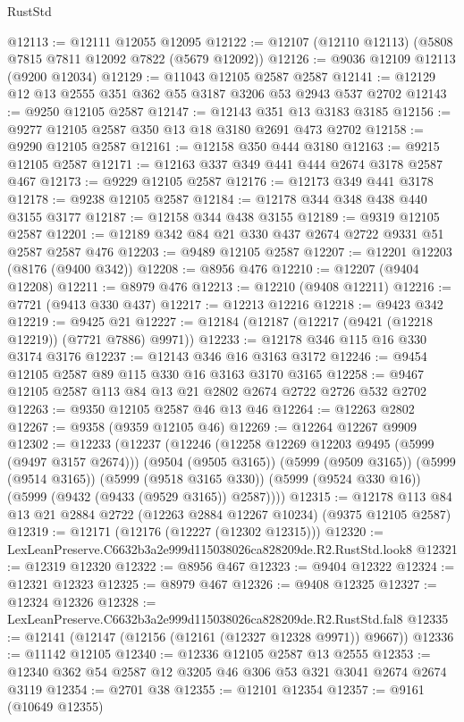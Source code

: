 \begin{lexlean}{RustStd}
\begin{coremodule}
@12113 := @12111 @12055 @12095
@12122 := @12107 (@12110 @12113) (@5808 @7815 @7811 @12092 @7822 (@5679 @12092))
@12126 := @9036 @12109 @12113 (@9200 @12034)
@12129 := @11043 @12105 @2587 @2587
@12141 := @12129 @12 @13 @2555 @351 @362 @55 @3187 @3206 @53 @2943 @537 @2702
@12143 := @9250 @12105 @2587
@12147 := @12143 @351 @13 @3183 @3185
@12156 := @9277 @12105 @2587 @350 @13 @18 @3180 @2691 @473 @2702
@12158 := @9290 @12105 @2587
@12161 := @12158 @350 @444 @3180
@12163 := @9215 @12105 @2587
@12171 := @12163 @337 @349 @441 @444 @2674 @3178 @2587 @467
@12173 := @9229 @12105 @2587
@12176 := @12173 @349 @441 @3178
@12178 := @9238 @12105 @2587
@12184 := @12178 @344 @348 @438 @440 @3155 @3177
@12187 := @12158 @344 @438 @3155
@12189 := @9319 @12105 @2587
@12201 := @12189 @342 @84 @21 @330 @437 @2674 @2722 @9331 @51 @2587 @2587 @476
@12203 := @9489 @12105 @2587
@12207 := @12201 @12203 (@8176 (@9400 @342))
@12208 := @8956 @476
@12210 := @12207 (@9404 @12208)
@12211 := @8979 @476
@12213 := @12210 (@9408 @12211)
@12216 := @7721 (@9413 @330 @437)
@12217 := @12213 @12216
@12218 := @9423 @342
@12219 := @9425 @21
@12227 := @12184 (@12187 (@12217 (@9421 (@12218 @12219)) (@7721 @7886) @9971))
@12233 := @12178 @346 @115 @16 @330 @3174 @3176
@12237 := @12143 @346 @16 @3163 @3172
@12246 := @9454 @12105 @2587 @89 @115 @330 @16 @3163 @3170 @3165
@12258 := @9467 @12105 @2587 @113 @84 @13 @21 @2802 @2674 @2722 @2726 @532 @2702
@12263 := @9350 @12105 @2587 @46 @13 @46
@12264 := @12263 @2802
@12267 := @9358 (@9359 @12105 @46)
@12269 := @12264 @12267 @9909
@12302 := @12233
    (@12237
      (@12246
        (@12258 @12269 @12203 @9495 (@5999 (@9497 @3157 @2674)))
        (@9504 (@9505 @3165))
        (@5999 (@9509 @3165))
        (@5999 (@9514 @3165))
        (@5999 (@9518 @3165 @330))
        (@5999 (@9524 @330 @16))
        (@5999 (@9432 (@9433 (@9529 @3165)) @2587))))
@12315 := @12178 @113 @84 @13 @21 @2884 @2722 (@12263 @2884 @12267 @10234) (@9375 @12105 @2587)
@12319 := @12171 (@12176 (@12227 (@12302 @12315)))
@12320 := LexLeanPreserve.C6632b3a2e999d115038026ca828209de.R2.RustStd.look8
@12321 := @12319 @12320
@12322 := @8956 @467
@12323 := @9404 @12322
@12324 := @12321 @12323
@12325 := @8979 @467
@12326 := @9408 @12325
@12327 := @12324 @12326
@12328 := LexLeanPreserve.C6632b3a2e999d115038026ca828209de.R2.RustStd.fal8
@12335 := @12141 (@12147 (@12156 (@12161 (@12327 @12328 @9971)) @9667))
@12336 := @11142 @12105
@12340 := @12336 @12105 @2587 @13 @2555
@12353 := @12340 @362 @54 @2587 @12 @3205 @46 @306 @53 @321 @3041 @2674 @2674 @3119
@12354 := @2701 @38
@12355 := @12101 @12354
@12357 := @9161 (@10649 @12355)

\end{coremodule}
\end{lexlean}
